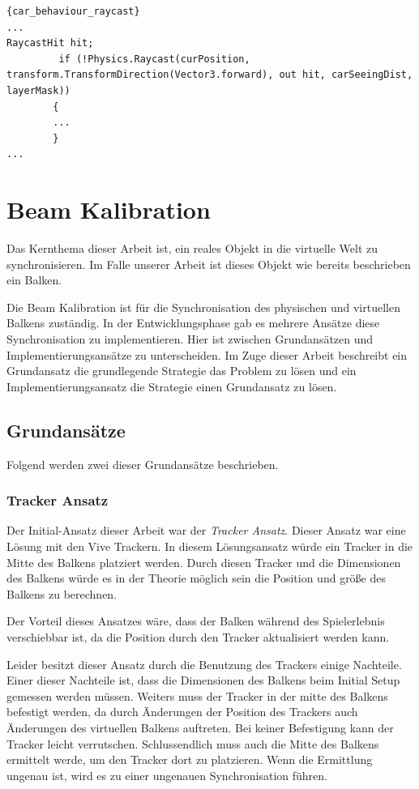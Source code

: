 \begin{lstlisting}{car_behaviour_raycast}
...
RaycastHit hit;
         if (!Physics.Raycast(curPosition, transform.TransformDirection(Vector3.forward), out hit, carSeeingDist, layerMask))
        {
        ...
        }
...
\end{lstlisting}

\section{Beam Kalibration}
\label{sec:beam-calibration}

Das Kernthema dieser Arbeit ist, ein reales Objekt in die virtuelle Welt zu synchronisieren.
Im Falle unserer Arbeit ist dieses Objekt wie bereits beschrieben ein Balken.

Die Beam Kalibration ist für die Synchronisation des physischen und virtuellen Balkens zuständig.
In der Entwicklungsphase gab es mehrere Ansätze diese Synchronisation zu implementieren.
Hier ist zwischen Grundansätzen und Implementierungsansätze zu unterscheiden.
Im Zuge dieser Arbeit beschreibt ein Grundansatz die grundlegende Strategie das Problem zu lösen und ein Implementierungsansatz die Strategie einen Grundansatz zu lösen.

\subsection{Grundansätze}\label{subsec:grundansaetze}

Folgend werden zwei dieser Grundansätze beschrieben.

\subsubsection{Tracker Ansatz}

Der Initial-Ansatz dieser Arbeit war der \emph{Tracker Ansatz}.
Dieser Ansatz war eine Lösung mit den Vive Trackern.
In diesem Lösungsansatz würde ein Tracker in die Mitte des Balkens platziert werden.
Durch diesen Tracker und die Dimensionen des Balkens würde es in der Theorie möglich sein die Position und größe des Balkens zu berechnen.

Der Vorteil dieses Ansatzes wäre, dass der Balken während des Spielerlebnis verschiebbar ist, da die Position durch den Tracker aktualisiert werden kann.

Leider besitzt dieser Ansatz durch die Benutzung des Trackers einige Nachteile.
Einer dieser Nachteile ist, dass die Dimensionen des Balkens beim Initial Setup gemessen werden müssen.
Weiters muss der Tracker in der mitte des Balkens befestigt werden, da durch Änderungen der Position des Trackers auch Änderungen des virtuellen Balkens auftreten.
Bei keiner Befestigung kann der Tracker leicht verrutschen.
Schlussendlich muss auch die Mitte des Balkens ermittelt werde, um den Tracker dort zu platzieren.
Wenn die Ermittlung ungenau ist, wird es zu einer ungenauen Synchronisation führen.

